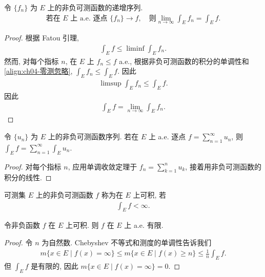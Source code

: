 \documentclass[../../main.tex]{subfiles}
\begin{document}
\begin{theorem}[单调收敛定理]\label{theorem:ch04-MCT}
令 $\{f_{n}\}$ 为 $E$ 上的非负可测函数的递增序列.
\begin{align*}
\text{若在 }E\text{ 上 a.e. 逐点 }\{f_{n}\}\to f,\quad\text{则}\lim_{n\to\infty}\int_{E}f_{n}=\int_{E}f.
\end{align*}
\end{theorem}

\begin{proof}
根据 Fatou 引理,
\begin{align*}
\int_{E}f\leqslant\liminf\int_{E}f_{n}.
\end{align*}
然而, 对每个指标 $n$, 在 $E$ 上 $f_{n}\leqslant f$ a.e., 根据非负可测函数的积分的单调性和\eqref{align:ch04-零测忽略}, $\int_{E}f_{n}\leqslant\int_{E}f$. 因此
\begin{align*}
\limsup\int_{E}f_{n}\leqslant\int_{E}f.
\end{align*}
因此
\begin{align*}
\int_{E}f=\lim_{n\to\infty}\int_{E}f_{n}.
\end{align*}
\end{proof}

\begin{corollary}\label{corollary:ch04-级数积分}
令 $\{u_{n}\}$ 为 $E$ 上的非负可测函数序列. 若在 $E$ 上 a.e. 逐点 $f=\sum_{n=1}^{\infty}u_{n}$, 则 $\int_{E}f=\sum_{n=1}^{\infty}\int_{E}u_{n}$.
\end{corollary}

\begin{proof}
对每个指标 $n$, 应用单调收敛定理于 $f_{n}=\sum_{k=1}^{n}u_{k}$, 接着用非负可测函数的积分的线性.
\end{proof}

\begin{definition}[非负可积函数]\label{definition:ch04-非负可积}
可测集 $E$ 上的非负可测函数 $f$ 称为在 $E$ 上可积, 若
\begin{align*}
\int_{E}f<\infty.
\end{align*}
\end{definition}

\begin{proposition}\label{proposition:ch04-可积有限}
令非负函数 $f$ 在 $E$ 上可积. 则 $f$ 在 $E$ 上 a.e. 有限.
\end{proposition}

\begin{proof}
令 $n$ 为自然数. Chebyshev 不等式和测度的单调性告诉我们
\begin{align*}
m\{x\in E\mid f(x)=\infty\}\leqslant m\{x\in E\mid f(x)\geqslant n\}\leqslant\frac{1}{n}\int_{E}f.
\end{align*}
但 $\int_{E}f$ 是有限的, 因此 $m\{x\in E\mid f(x)=\infty\}=0$.
\end{proof}
\end{document}

